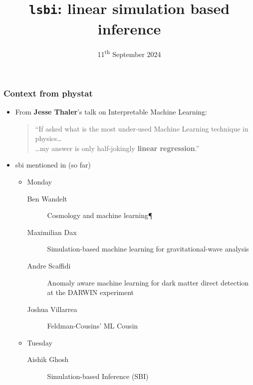 \documentclass[aspectratio=169]{beamer}
\title{\texttt{lsbi}: linear simulation based inference }
\date{11\textsuperscript{th} September 2024}
\begin{document}
\begin{frame}
    \titlepage
\end{frame}

\begin{frame}
    \frametitle{Context from phystat}
    \begin{itemize}
        \item From \textbf{Jesse Thaler}'s talk on Interpretable Machine Learning:
            \begin{quote}
                ``If asked what is the most under-used Machine Learning technique in physics\ldots\\ \hfill\ldots my answer is only half-jokingly \textbf{linear regression}.''
            \end{quote}
        \item sbi mentioned in (so far)
            \begin{itemize}
                \item Monday
                    \begin{description}
                        \item[Ben Wandelt] Cosmology and machine learning¶
                        \item[Maximilian Dax] Simulation-based machine learning for gravitational-wave analysis
                        \item[Andre Scaffidi] Anomaly aware machine learning for dark matter direct detection at the DARWIN experiment
                        \item[Joshua Villarrea] Feldman-Cousins’ ML Cousin
                    \end{description}
                \item Tuesday
                    \begin{description}
                        \item[Aishik Ghosh] Simulation-based Inference (SBI)
                    \end{description}
            \end{itemize}
    \end{itemize}
\end{frame}
\end{document}
